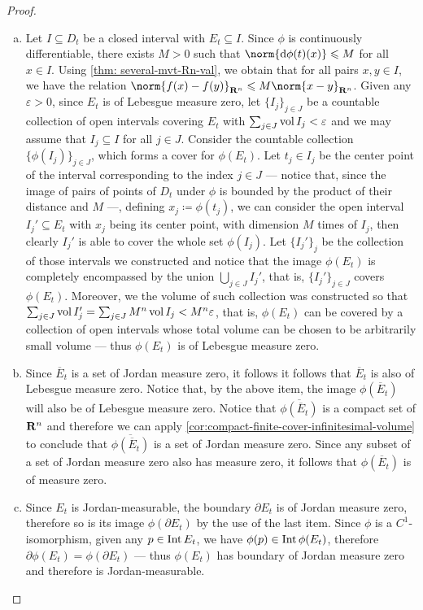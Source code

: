 \begin{proof}
\begin{enumerate}[(a)]\setlength\itemsep{0em}
\item Let \(I \subseteq D_t\) be a closed interval with \(E_t \subseteq
I\). Since \(\phi\) is continuously differentiable, there exists \(M > 0\) such
that \(\norm{\diff \phi(t)(x)} \leq M\) for all \(x \in I\). Using \cref{thm:
several-mvt-Rn-val}, we obtain that for all pairs \(x, y \in I\), we have the
relation \(\norm{f(x) - f(y)}_{\R^n} \leq M \norm{x - y}_{\R^n}\). Given any
\(\varepsilon > 0\), since \(E_t\) is of Lebesgue measure zero, let
\(\{I_{j}\}_{j \in J}\) be a countable collection of open intervals covering
\(E_t\) with \(\sum_{j \in J} \operatorname{vol} I_j < \varepsilon\) and we may assume that
\(I_j \subseteq I\) for all \(j \in J\). Consider the countable collection
\(\{\phi(I_{j})\}_{j \in J}\), which forms a cover for \(\phi(E_t)\). Let \(t_j
\in I_j\) be the center point of the interval corresponding to the index \(j \in
J\) --- notice that, since the image of pairs of points of \(D_t\) under
\(\phi\) is bounded by the product of their distance and \(M\) ---, defining
\(x_j \coloneq \phi(t_j)\), we can consider the open interval \(I_j' \subseteq
E_t\) with \(x_j\) being its center point, with dimension \(M\) times of
\(I_j\), then clearly \(I_j'\) is able to cover the whole set \(\phi(I_j)\). Let
\(\{I_{j}'\}_j\) be the collection of those intervals we constructed and notice
that the image \(\phi(E_t)\) is completely encompassed by the union \(\bigcup_{j
\in J} I_j'\), that is, \(\{I_{j}'\}_{j \in J}\) covers \(\phi(E_t)\). Moreover,
we the volume of such collection was constructed so that \(\sum_{j \in J} \operatorname{vol}
I_j' = \sum_{j \in J} M^n \operatorname{vol} I_j < M^n \varepsilon\), that is, \(\phi(E_t)\)
can be covered by a collection of open intervals whose total volume can be
chosen to be arbitrarily small volume --- thus \(\phi(E_t)\) is of Lebesgue
measure zero.

\item Since \(\overline E_t\) is a set of Jordan measure zero, it follows it
  follows that \(\overline E_t\) is also of Lebesgue measure zero. Notice that,
  by the above item, the image \(\phi(\overline E_t)\) will also be of Lebesgue
  measure zero. Notice that \(\overline{\phi(\overline E_t)}\) is a compact set
  of \(\mathbf{R}^n\) and therefore we can apply
  \cref{cor:compact-finite-cover-infinitesimal-volume} to conclude that
  \(\overline{\phi(\overline E_t)}\) is a set of Jordan measure zero. Since any
  subset of a set of Jordan measure zero also has measure zero, it follows that
  \(\phi(\overline E_t)\) is of measure zero.

\item Since \(E_t\) is Jordan-measurable, the boundary \(\partial E_t\) is of
  Jordan measure zero, therefore so is its image \(\phi(\partial E_t)\) by the
  use of the last item. Since \(\phi\) is a \(C^1\)-isomorphism, given any \(p \in
  \operatorname{Int} E_t\), we have \(\phi(p) \in \operatorname{Int} \phi(E_t)\), therefore \(\partial
  \phi(E_t) = \phi(\partial E_t)\) --- thus \(\phi(E_t)\) has boundary of Jordan
  measure zero and therefore is Jordan-measurable.
\end{enumerate}
\end{proof}

